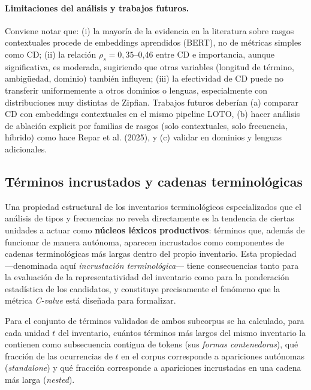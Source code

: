 \paragraph{Limitaciones del análisis y trabajos futuros.}

Conviene notar que: (i) la mayoría de la evidencia en la literatura sobre rasgos contextuales procede de embeddings aprendidos (BERT), no de métricas simples como CD; (ii) la relación $\rho_s=0{,}35$--0{,}46 entre CD e importancia, aunque significativa, es moderada, sugiriendo que otras variables (longitud de término, ambigüedad, dominio) también influyen; (iii) la efectividad de CD puede no transferir uniformemente a otros dominios o lenguas, especialmente con distribuciones muy distintas de Zipfian. Trabajos futuros deberían (a) comparar CD con embeddings contextuales en el mismo pipeline LOTO, (b) hacer análisis de ablación explicit por familias de rasgos (solo contextuales, solo frecuencia, híbrido) como hace Repar et al. (2025), y (c) validar en dominios y lenguas adicionales.


\subsection{Términos incrustados y cadenas terminológicas}
\label{subsec:terminos_incrustados}

Una propiedad estructural de los inventarios terminológicos especializados que el análisis de tipos y frecuencias no revela directamente es la tendencia de ciertas unidades a actuar como \textbf{núcleos léxicos productivos}: términos que, además de funcionar de manera autónoma, aparecen incrustados como componentes de cadenas terminológicas más largas dentro del propio inventario. Esta propiedad ---denominada aquí \textit{incrustación terminológica}--- tiene consecuencias tanto para la evaluación de la representatividad del inventario como para la ponderación estadística de los candidatos, y constituye precisamente el fenómeno que la métrica \textit{C-value} está diseñada para formalizar.

Para el conjunto de términos validados de ambos subcorpus se ha calculado, para cada unidad $t$ del inventario, cuántos términos más largos del mismo inventario la contienen como subsecuencia contigua de tokens (sus \emph{formas contenedoras}), qué fracción de las ocurrencias de $t$ en el corpus corresponde a apariciones autónomas (\emph{standalone}) y qué fracción corresponde a apariciones incrustadas en una cadena más larga (\emph{nested}).

